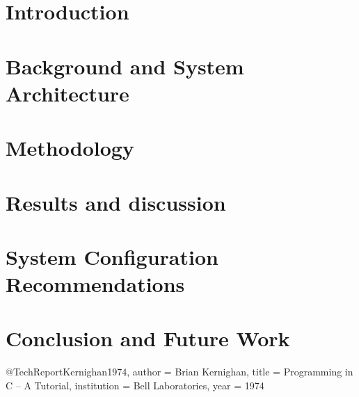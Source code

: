 \documentclass[english, version-2020-11]{uzl-thesis}
\begin{document}
\chapter{Introduction}


\chapter{Background and System Architecture}


\chapter{Methodology}


\chapter{Results and discussion}


\chapter{System Configuration Recommendations}


\chapter{Conclusion and Future Work}


\begin{bibtex-entries}
@TechReport{Kernighan1974,
author = {Brian Kernighan},
title = {Programming in C – A Tutorial},
institution = {Bell Laboratories},
year = {1974}
}
\end{bibtex-entries}
\end{document}
